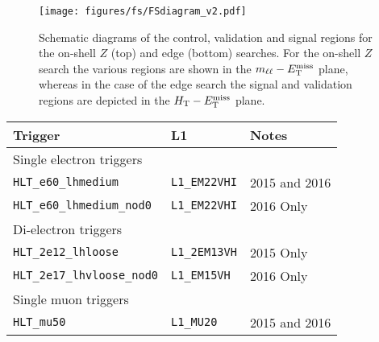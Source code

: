\begin{figure}[h]
\centering
\texttt{[image: figures/fs/FSdiagram\_v2.pdf]}\\
\caption{
Schematic diagrams of the control, validation and signal regions for the on-shell $Z$ (top) and edge (bottom) searches.
For the on-shell $Z$ search the various regions are shown in the $m_{\ell\ell}-E_{\text{T}}^{\text{miss}}$ plane, whereas in the case of the edge search the
signal and validation regions are depicted in the $H_{\text{T}}-E_{\text{T}}^{\text{miss}}$ plane.
\label{fig:region_diagrams}
}
\end{figure}

\begin{table}[hbt]
\begin{center}
\begin{tabular}{|lll|}
\hline
Trigger                                       & L1                   & Notes \\ 
\hline\hline
\multicolumn{3}{|l|}{Single electron triggers} \\
\hline
\texttt{HLT\_e60\_lhmedium}                   & \texttt{L1\_EM22VHI} & 2015 and 2016 \\
\texttt{HLT\_e60\_lhmedium\_nod0}             & \texttt{L1\_EM22VHI} & 2016 Only \\
\hline
\multicolumn{3}{|l|}{Di-electron triggers} \\
\hline
\texttt{HLT\_2e12\_lhloose}                   & \texttt{L1\_2EM13VH} & 2015 Only \\
\texttt{HLT\_2e17\_lhvloose\_nod0}            & \texttt{L1\_EM15VH}  & 2016 Only \\
\hline\hline
\multicolumn{3}{|l|}{Single muon triggers} \\
\hline
\texttt{HLT\_mu50}                            & \texttt{L1\_MU20}    & 2015 and 2016 \\

\end{tabular}
\end{center}
\end{table}
